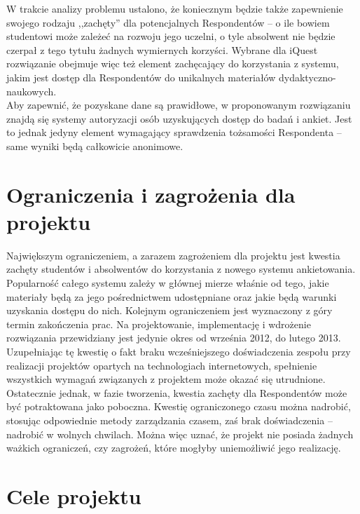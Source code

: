 W trakcie analizy problemu ustalono, że koniecznym będzie także zapewnienie swojego rodzaju ,,zachęty'' dla potencjalnych Respondentów -- o ile bowiem studentowi może zależeć na rozwoju jego uczelni, o tyle absolwent nie będzie czerpał z tego tytułu żadnych wymiernych korzyści. Wybrane dla iQuest rozwiązanie obejmuje więc też element zachęcający do korzystania z systemu, jakim jest dostęp dla Respondentów do unikalnych materiałów dydaktyczno-naukowych. \\

Aby zapewnić, że pozyskane dane są prawidłowe, w proponowanym rozwiązaniu znajdą się systemy autoryzacji osób uzyskujących dostęp do badań i ankiet. Jest to jednak jedyny element wymagający sprawdzenia tożsamości Respondenta -- same wyniki będą całkowicie anonimowe. \\

\section{Ograniczenia i zagrożenia dla projektu}
\label{Chapter12}

Największym ograniczeniem, a zarazem zagrożeniem dla projektu jest kwestia zachęty studentów i absolwentów do korzystania z nowego systemu ankietowania. Popularność całego systemu zależy w głównej mierze właśnie od tego, jakie materiały będą za jego pośrednictwem udostępniane oraz jakie będą warunki uzyskania dostępu do nich. Kolejnym ograniczeniem jest wyznaczony z góry termin zakończenia prac. Na projektowanie, implementację i wdrożenie rozwiązania przewidziany jest jedynie okres od września 2012, do lutego 2013. Uzupełniając tę kwestię o fakt braku wcześniejszego doświadczenia zespołu przy realizacji projektów opartych na technologiach internetowych, spełnienie wszystkich wymagań związanych z projektem może okazać się utrudnione. \\

Ostatecznie jednak, w fazie tworzenia, kwestia zachęty dla Respondentów może być potraktowana jako poboczna. Kwestię ograniczonego czasu można nadrobić, stosując odpowiednie metody zarządzania czasem, zaś brak doświadczenia -- nadrobić w wolnych chwilach. Można więc uznać, że projekt nie posiada żadnych ważkich ograniczeń, czy zagrożeń, które mogłyby uniemożliwić jego realizację. \\

\section{Cele projektu}
\label{Chapter13}

